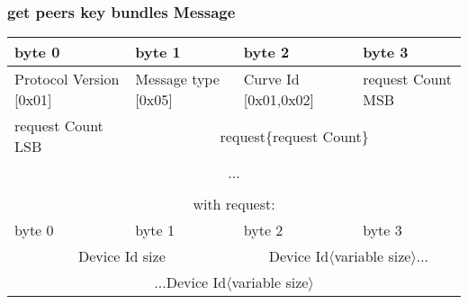\documentclass[a4paper,11pt]{article}
\begin{document}
    \subsubsection{get peers key bundles Message}
      \begin{center}
      \begin{tabular}{ | p{1.4in} | p{1.4in} | p{1.4in} | p{1.4in} |}
        \hline
        \cellcolor[gray]{0.85} byte 0 & \cellcolor[gray]{0.85} byte 1 & \cellcolor[gray]{0.85} byte 2 & \cellcolor[gray]{0.85}byte 3\\
        \hline
        Protocol Version [0x01] & Message type [0x05] & Curve Id [0x01,0x02] & request Count MSB\\
        \hline
        request Count LSB & \multicolumn{3}{|c|}{request\{request Count\}}\\
        \cline{1-1}
        \multicolumn{4}{|c|}{...}\\
        \hline
        \multicolumn{4}{c}{}\\
        \multicolumn{4}{c}{with request:}\\
        \hline
        \cellcolor[gray]{0.95} byte 0 & \cellcolor[gray]{0.95} byte 1 & \cellcolor[gray]{0.95} byte 2 & \cellcolor[gray]{0.95}byte 3\\
        \hline
        \multicolumn{2}{|c|}{Device Id size}&\multicolumn{2}{|c|}{Device Id$\langle$variable size$\rangle$...}\\
        \hline
        \multicolumn{4}{|c|}{...Device Id$\langle$variable size$\rangle$}\\
        \hline
      \end{tabular}
      \end{center}
    
\end{document}
